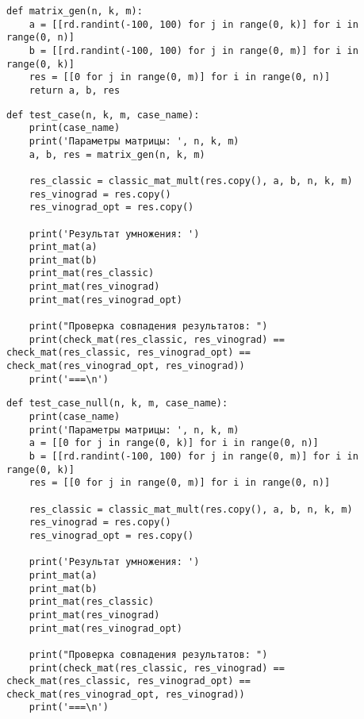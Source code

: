 \begin{lstlisting}[label=some-code-5,caption=Реализация функции рандомной генерации матриц]
def matrix_gen(n, k, m):
    a = [[rd.randint(-100, 100) for j in range(0, k)] for i in range(0, n)]
    b = [[rd.randint(-100, 100) for j in range(0, m)] for i in range(0, k)]
    res = [[0 for j in range(0, m)] for i in range(0, n)]
    return a, b, res
\end{lstlisting}

\begin{lstlisting}[label=some-code-6,caption=Реализация общей функции тестирования]
def test_case(n, k, m, case_name):
    print(case_name)
    print('Параметры матрицы: ', n, k, m)
    a, b, res = matrix_gen(n, k, m)

    res_classic = classic_mat_mult(res.copy(), a, b, n, k, m)
    res_vinograd = res.copy()
    res_vinograd_opt = res.copy()

    print('Результат умножения: ')
    print_mat(a)
    print_mat(b)
    print_mat(res_classic)
    print_mat(res_vinograd)
    print_mat(res_vinograd_opt)

    print("Проверка совпадения результатов: ")
    print(check_mat(res_classic, res_vinograd) == check_mat(res_classic, res_vinograd_opt) == check_mat(res_vinograd_opt, res_vinograd))
    print('===\n')
\end{lstlisting}

\begin{lstlisting}[label=some-code-7,caption=Реализация функции для случая нулевой матрицы]
def test_case_null(n, k, m, case_name):
    print(case_name)
    print('Параметры матрицы: ', n, k, m)
    a = [[0 for j in range(0, k)] for i in range(0, n)]
    b = [[rd.randint(-100, 100) for j in range(0, m)] for i in range(0, k)]
    res = [[0 for j in range(0, m)] for i in range(0, n)]

    res_classic = classic_mat_mult(res.copy(), a, b, n, k, m)
    res_vinograd = res.copy()
    res_vinograd_opt = res.copy()

    print('Результат умножения: ')
    print_mat(a)
    print_mat(b)
    print_mat(res_classic)
    print_mat(res_vinograd)
    print_mat(res_vinograd_opt)

    print("Проверка совпадения результатов: ")
    print(check_mat(res_classic, res_vinograd) == check_mat(res_classic, res_vinograd_opt) == check_mat(res_vinograd_opt, res_vinograd))
    print('===\n')
\end{lstlisting}


